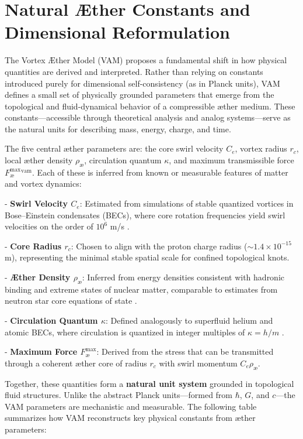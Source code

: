 \section{Natural Æther Constants and Dimensional Reformulation}

The Vortex Æther Model (VAM) proposes a fundamental shift in how physical quantities are derived and interpreted. Rather than relying on constants introduced purely for dimensional self-consistency (as in Planck units), VAM defines a small set of physically grounded parameters that emerge from the topological and fluid-dynamical behavior of a compressible æther medium. These constants—accessible through theoretical analysis and analog systems—serve as the natural units for describing mass, energy, charge, and time.

The five central æther parameters are: the core swirl velocity $C_e$, vortex radius $r_c$, local æther density $\rho_\text{\ae}$, circulation quantum $\kappa$, and maximum transmissible force $F^{\text{max}}_{\text{\ae}}^{\text{vam}}$. Each of these is inferred from known or measurable features of matter and vortex dynamics:

- \textbf{Swirl Velocity $C_e$}: Estimated from simulations of stable quantized vortices in Bose–Einstein condensates (BECs), where core rotation frequencies yield swirl velocities on the order of $10^6$ m/s \cite{Pethick2008BEC,Kleckner2013KnottedVortices}.

- \textbf{Core Radius $r_c$}: Chosen to align with the proton charge radius ($\sim 1.4 \times 10^{-15}$ m), representing the minimal stable spatial scale for confined topological knots.

- \textbf{Æther Density $\rho_\text{\ae}$}: Inferred from energy densities consistent with hadronic binding and extreme states of nuclear matter, comparable to estimates from neutron star core equations of state \cite{Lattimer2016EOS}.

- \textbf{Circulation Quantum $\kappa$}: Defined analogously to superfluid helium and atomic BECs, where circulation is quantized in integer multiples of $\kappa = h/m$ \cite{Donnelly1991QuantizedVortices}.

- \textbf{Maximum Force $F^{\text{max}}_{\text{\ae}}$}: Derived from the stress that can be transmitted through a coherent æther core of radius $r_c$ with swirl momentum $C_e \rho_\text{\ae}$.

Together, these quantities form a \textbf{natural unit system} grounded in topological fluid structures. Unlike the abstract Planck units—formed from $\hbar$, $G$, and $c$—the VAM parameters are mechanistic and measurable. The following table summarizes how VAM reconstructs key physical constants from æther parameters:

